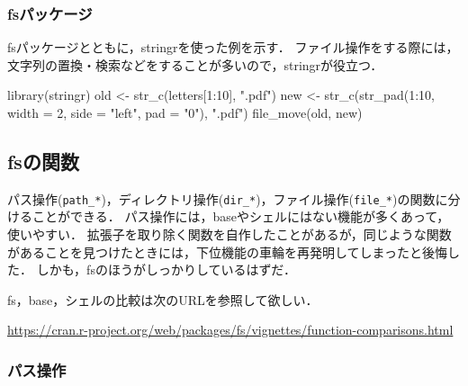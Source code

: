 \documentclass[
]{article}
\newenvironment{Shaded}{\begin{snugshade}}{\end{snugshade}}
\newcommand{\AttributeTok}[1]{\textcolor[rgb]{0.77,0.63,0.00}{#1}}
\newcommand{\DecValTok}[1]{\textcolor[rgb]{0.00,0.00,0.81}{#1}}
\newcommand{\FunctionTok}[1]{\textcolor[rgb]{0.00,0.00,0.00}{#1}}
\newcommand{\NormalTok}[1]{#1}
\newcommand{\OtherTok}[1]{\textcolor[rgb]{0.56,0.35,0.01}{#1}}
\newcommand{\SpecialCharTok}[1]{\textcolor[rgb]{0.00,0.00,0.00}{#1}}
\newcommand{\StringTok}[1]{\textcolor[rgb]{0.31,0.60,0.02}{#1}}
\begin{document}
\hypertarget{fsux30d1ux30c3ux30b1ux30fcux30b8}{%
\subsubsection{fsパッケージ}\label{fsux30d1ux30c3ux30b1ux30fcux30b8}}

fsパッケージとともに，stringrを使った例を示す．
ファイル操作をする際には，文字列の置換・検索などをすることが多いので，stringrが役立つ．

\begin{Shaded}
\begin{Highlighting}[]
\FunctionTok{library}\NormalTok{(stringr)}
\NormalTok{old }\OtherTok{\textless{}{-}} \FunctionTok{str\_c}\NormalTok{(letters[}\DecValTok{1}\SpecialCharTok{:}\DecValTok{10}\NormalTok{], }\StringTok{".pdf"}\NormalTok{)}
\NormalTok{new }\OtherTok{\textless{}{-}} \FunctionTok{str\_c}\NormalTok{(}\FunctionTok{str\_pad}\NormalTok{(}\DecValTok{1}\SpecialCharTok{:}\DecValTok{10}\NormalTok{, }\AttributeTok{width =} \DecValTok{2}\NormalTok{, }\AttributeTok{side =} \StringTok{"left"}\NormalTok{, }\AttributeTok{pad =} \StringTok{"0"}\NormalTok{), }\StringTok{".pdf"}\NormalTok{)}
\FunctionTok{file\_move}\NormalTok{(old, new)}
\end{Highlighting}
\end{Shaded}

\hypertarget{fsux306eux95a2ux6570}{%
\subsection{fsの関数}\label{fsux306eux95a2ux6570}}

パス操作(\texttt{path\_*})，ディレクトリ操作(\texttt{dir\_*})，ファイル操作(\texttt{file\_*})の関数に分けることができる．
パス操作には，baseやシェルにはない機能が多くあって，使いやすい．
拡張子を取り除く関数を自作したことがあるが，同じような関数があることを見つけたときには，下位機能の車輪を再発明してしまったと後悔した．
しかも，fsのほうがしっかりしているはずだ．

fs，base，シェルの比較は次のURLを参照して欲しい．

\url{https://cran.r-project.org/web/packages/fs/vignettes/function-comparisons.html}

\hypertarget{ux30d1ux30b9ux64cdux4f5c}{%
\subsubsection{パス操作}\label{ux30d1ux30b9ux64cdux4f5c}}
\end{document}
